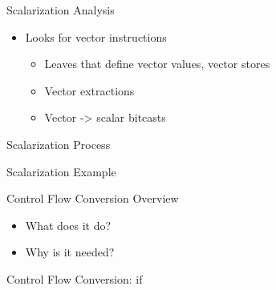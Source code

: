 \begin{frame}{Scalarization Analysis}

\begin{itemize}
    \item Looks for vector instructions
    \begin{itemize}
        \item Leaves that define vector values, vector stores
        \item Vector extractions
        \item Vector -> scalar bitcasts
    \end{itemize}
    
\end{itemize}

\end{frame}


\begin{frame}{Scalarization Process}


\end{frame}


\begin{frame}{Scalarization Example}


\end{frame}



\begin{frame}{Control Flow Conversion Overview}

\begin{itemize}
    \item What does it do?
    \item Why is it needed?
\end{itemize}

\end{frame}


\begin{frame}{Control Flow Conversion: if}

\end{frame}


